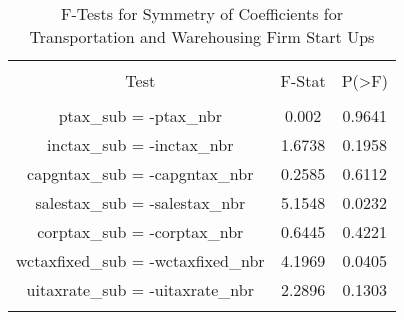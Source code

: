 
\begin{table}[!htbp] \centering 
  \caption{F-Tests for Symmetry of Coefficients for Transportation and Warehousing Firm Start Ups} 
  \label{48-49Ftests} 
\begin{tabular}{@{\extracolsep{5pt}} ccc} 
\\[-1.8ex]\hline 
\hline \\[-1.8ex] 
Test & F-Stat & P(\textgreater F) \\ 
\hline \\[-1.8ex] 
ptax\_sub = -ptax\_nbr & 0.002 & 0.9641 \\ 
inctax\_sub = -inctax\_nbr & 1.6738 & 0.1958 \\ 
capgntax\_sub = -capgntax\_nbr & 0.2585 & 0.6112 \\ 
salestax\_sub = -salestax\_nbr & 5.1548 & 0.0232 \\ 
corptax\_sub = -corptax\_nbr & 0.6445 & 0.4221 \\ 
wctaxfixed\_sub = -wctaxfixed\_nbr & 4.1969 & 0.0405 \\ 
uitaxrate\_sub = -uitaxrate\_nbr & 2.2896 & 0.1303 \\ 
\hline \\[-1.8ex] 
\end{tabular} 
\end{table} 
